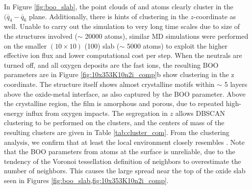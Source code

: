 \documentclass[manuscript=cmatex]{achemso}
\begin{document}
In Figure \ref{fig:boo_slab}, the point clouds of  and  atoms clearly cluster in the $(\bar{q}_4-\bar{q}_6$ plane. Additionally, there is hints of clustering in the $z$-coordinate as well. Unable to carry out the simulation to very long time scales due to size of the structures involved ($\sim$ 20000 atoms), similar MD simulations were performed on the smaller $(10\times10)$  (100) slab ($\sim$ 5000 atoms) to exploit the higher effective ion flux and lower computational cost per step. When the neutrals are turned off, and all oxygen deposits are the fast ions, the resulting BOO parameters are in Figure \ref{fig:10x353K10n2i_comp}b show clustering in the z coordinate. The structure itself shows almost crystalline  motifs within $\sim$ 5 layers above the oxide-metal interface, as also captured by the BOO parameter. Above the crystalline region, the film is amorphous and porous, due to repeated high-energy influx from oxygen impacts. The segregation in $z$ allows DBSCAN clustering to be performed on the clusters, and the centers of mass of the resulting clusters are given in Table \ref{tab:cluster_com}. From the clustering analysis, we confirm that at least the local environment closely resembles . Note that the BOO parameters from atoms at the surface is unreliable, due to the tendency of the Voronoi tessellation definition of neighbors to overestimate the number of neighbors. This causes the large spread near the top of the oxide slab seen in Figures \ref{fig:boo_slab,fig:10x353K10n2i_comp}. 
\end{document}
